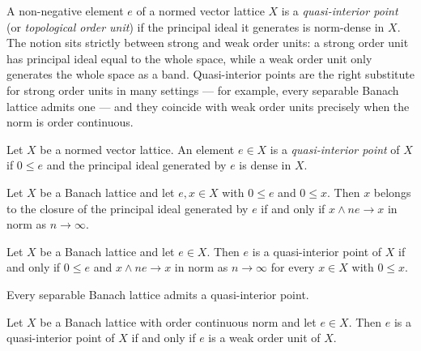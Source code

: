 A non-negative element $e$ of a normed vector lattice $X$ is a
\emph{quasi-interior point} (or \emph{topological order unit}) if the
principal ideal it generates is norm-dense in $X$. The notion sits
strictly between strong and weak order units: a strong order unit has
principal ideal equal to the whole space, while a weak order unit only
generates the whole space as a band. Quasi-interior points are the
right substitute for strong order units in many settings — for example,
every separable Banach lattice admits one — and they coincide with weak
order units precisely when the norm is order continuous.

\begin{definition}
\label{def:quasiInteriorPoint}
\leanok
{}
Let $X$ be a normed vector lattice. An element $e \in X$ is a
\emph{quasi-interior point} of $X$ if $0 \le e$ and the principal ideal
generated by $e$ is dense in $X$.
\end{definition}

\begin{theorem}
\label{thm:mem-closure-principal-iff-tendsto-inf}
\leanok
{}
Let $X$ be a Banach lattice and let $e, x \in X$ with $0 \le e$ and
$0 \le x$. Then $x$ belongs to the closure of the principal ideal
generated by $e$ if and only if $x \wedge n e \to x$ in norm as
$n \to \infty$.
\end{theorem}

\begin{theorem}
\label{thm:quasiInteriorPoint-iff-tendsto-inf}
\leanok
{}
Let $X$ be a Banach lattice and let $e \in X$. Then $e$ is a
quasi-interior point of $X$ if and only if $0 \le e$ and
$x \wedge n e \to x$ in norm as $n \to \infty$ for every $x \in X$
with $0 \le x$.
\end{theorem}

\begin{theorem}
\label{thm:exists-quasiInteriorPoint-of-separable}
\leanok
{}
Every separable Banach lattice admits a quasi-interior point.
\end{theorem}

\begin{theorem}
\label{thm:quasiInteriorPoint-iff-weakOrderUnit}
\leanok
{}
Let $X$ be a Banach lattice with order continuous norm and let
$e \in X$. Then $e$ is a quasi-interior point of $X$ if and only if
$e$ is a weak order unit of $X$.
\end{theorem}

